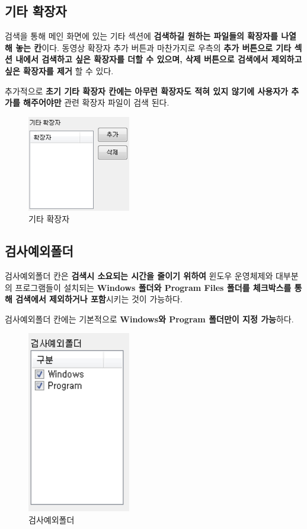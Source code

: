 \documentclass[a4paper, 13pt]{article} %
\begin{document}
		\subsection{기타 확장자}
		검색을 통해 메인 화면에 있는 기타 섹션에 \textbf{검색하길 원하는 파일들의 확장자를 나열해 놓는 칸}이다. 동영상 확장자 추가 버튼과 마찬가지로 우측의 \textbf{추가 버튼으로 기타 섹션 내에서 검색하고 싶은 확장자를 더할 수 있으며, 삭제 버튼으로 검색에서 제외하고 싶은 확장자를 제거} 할 수 있다.
		
		추가적으로 \textbf{초기 기타 확장자 칸에는 아무런 확장자도 적혀 있지 않기에 사용자가 추가를 해주어야만} 관련 확장자 파일이 검색 된다.
		
		\begin{figure}[h]
			\centering
			\includegraphics[width=0.4\textwidth]{Figures/etc}
			\caption{기타 확장자}
			\label{fig:etc}
		\end{figure}
	
		\newpage
	
		\subsection{검사예외폴더}	
		검사예외폴더 칸은 \textbf{검색시 소요되는 시간을 줄이기 위하여} 윈도우 운영체제와 대부분의 프로그램들이 설치되는 \textbf{ Windows 폴더와 Program Files 폴더를 체크박스를 통해 검색에서 제외하거나 포함}시키는 것이 가능하다.
		
		검사예외폴더 칸에는 기본적으로 \textbf{Windows와 Program 폴더만이 지정 가능}하다.
		
		\begin{figure}[h]
			\centering
			\includegraphics[width=0.4\textwidth]{Figures/except}
			\caption{검사예외폴더}
			\label{fig:except}
		\end{figure}
	
\end{document}
